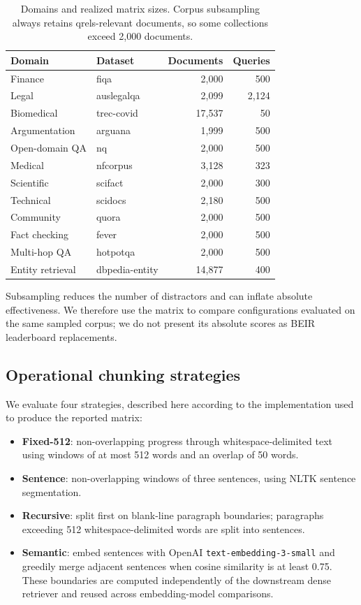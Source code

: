 \documentclass[10pt,letterpaper]{article}
\begin{document}
\begin{table}[t]
\centering
\caption{Domains and realized matrix sizes. Corpus subsampling always retains qrels-relevant
documents, so some collections exceed 2,000 documents.}
\label{tab:data}
\small
\begin{tabular}{llrr}
\toprule
Domain & Dataset & Documents & Queries \\
\midrule
Finance & fiqa & 2,000 & 500 \\
Legal & auslegalqa & 2,099 & 2,124 \\
Biomedical & trec-covid & 17,537 & 50 \\
Argumentation & arguana & 1,999 & 500 \\
Open-domain QA & nq & 2,000 & 500 \\
Medical & nfcorpus & 3,128 & 323 \\
Scientific & scifact & 2,000 & 300 \\
Technical & scidocs & 2,180 & 500 \\
Community & quora & 2,000 & 500 \\
Fact checking & fever & 2,000 & 500 \\
Multi-hop QA & hotpotqa & 2,000 & 500 \\
Entity retrieval & dbpedia-entity & 14,877 & 400 \\
\bottomrule
\end{tabular}
\end{table}

Subsampling reduces the number of distractors and can inflate absolute effectiveness. We therefore
use the matrix to compare configurations evaluated on the same sampled corpus; we do not present
its absolute scores as BEIR leaderboard replacements.

\subsection{Operational chunking strategies}

We evaluate four strategies, described here according to the implementation used to produce the
reported matrix:
\begin{itemize}
    \item \textbf{Fixed-512}: non-overlapping progress through whitespace-delimited text using
    windows of at most 512 words and an overlap of 50 words.
    \item \textbf{Sentence}: non-overlapping windows of three sentences, using NLTK sentence
    segmentation.
    \item \textbf{Recursive}: split first on blank-line paragraph boundaries; paragraphs exceeding
    512 whitespace-delimited words are split into sentences.
    \item \textbf{Semantic}: embed sentences with OpenAI
    \texttt{text-embedding-3-small} and greedily merge adjacent sentences when cosine similarity
    is at least 0.75. These boundaries are computed independently of the downstream dense
    retriever and reused across embedding-model comparisons.
\end{itemize}
\end{document}
